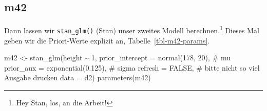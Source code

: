 \documentclass[
  a4paper,
  DIV=11]{scrreprt}
\newenvironment{Shaded}{\begin{snugshade}}{\end{snugshade}}
\newcommand{\AttributeTok}[1]{\textcolor[rgb]{0.40,0.45,0.13}{#1}}
\newcommand{\CommentTok}[1]{\textcolor[rgb]{0.37,0.37,0.37}{#1}}
\newcommand{\ConstantTok}[1]{\textcolor[rgb]{0.56,0.35,0.01}{#1}}
\newcommand{\DecValTok}[1]{\textcolor[rgb]{0.68,0.00,0.00}{#1}}
\newcommand{\FloatTok}[1]{\textcolor[rgb]{0.68,0.00,0.00}{#1}}
\newcommand{\FunctionTok}[1]{\textcolor[rgb]{0.28,0.35,0.67}{#1}}
\newcommand{\NormalTok}[1]{\textcolor[rgb]{0.00,0.23,0.31}{#1}}
\newcommand{\OtherTok}[1]{\textcolor[rgb]{0.00,0.23,0.31}{#1}}
\newcommand{\SpecialCharTok}[1]{\textcolor[rgb]{0.37,0.37,0.37}{#1}}
\theoremstyle{definition}
\theoremstyle{remark}
\begin{document}
\hypertarget{m42}{%
\subsection{m42}\label{m42}}

Dann lassen wir \texttt{stan\_glm()} (Stan) unser zweites Modell
berechnen.\footnote{Hey Stan, los, an die Arbeit!} Dieses Mal geben wir
die Priori-Werte explizit an, Tabelle~\ref{tbl-m42-params}.

\begin{Shaded}
\begin{Highlighting}[]
\NormalTok{m42 }\OtherTok{\textless{}{-}} 
  \FunctionTok{stan\_glm}\NormalTok{(height }\SpecialCharTok{\textasciitilde{}} \DecValTok{1}\NormalTok{, }
           \AttributeTok{prior\_intercept =} \FunctionTok{normal}\NormalTok{(}\DecValTok{178}\NormalTok{, }\DecValTok{20}\NormalTok{),  }\CommentTok{\# mu}
           \AttributeTok{prior\_aux =} \FunctionTok{exponential}\NormalTok{(}\FloatTok{0.125}\NormalTok{),  }\CommentTok{\# sigma}
           \AttributeTok{refresh =} \ConstantTok{FALSE}\NormalTok{,  }\CommentTok{\# bitte nicht so viel Ausgabe drucken}
           \AttributeTok{data =}\NormalTok{ d2)}
\FunctionTok{parameters}\NormalTok{(m42)}
\end{Highlighting}
\end{Shaded}
\end{document}
